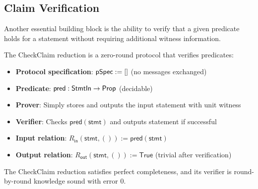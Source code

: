 \subsection{Claim Verification}

Another essential building block is the ability to verify that a given predicate holds for a statement without requiring additional witness information.

\begin{definition}
    \label{def:checkclaim_reduction}
    The CheckClaim reduction is a zero-round protocol that verifies predicates:
    \begin{itemize}
        \item \textbf{Protocol specification}: $\mathsf{pSpec} := []$ (no messages exchanged)
        \item \textbf{Predicate}: $\mathsf{pred} : \mathsf{StmtIn} \to \mathsf{Prop}$ (decidable)
        \item \textbf{Prover}: Simply stores and outputs the input statement with unit witness
        \item \textbf{Verifier}: Checks $\mathsf{pred}(\mathsf{stmt})$ and outputs statement if successful
        \item \textbf{Input relation}: $R_{\mathsf{in}}(\mathsf{stmt}, ()) := \mathsf{pred}(\mathsf{stmt})$
        \item \textbf{Output relation}: $R_{\mathsf{out}}(\mathsf{stmt}, ()) := \mathsf{True}$ (trivial after verification)
    \end{itemize}
    \leanok
\end{definition}

\begin{theorem}
    The CheckClaim reduction satisfies perfect completeness, and its verifier is round-by-round knowledge sound with error $0$.
    \leanok
\end{theorem}

